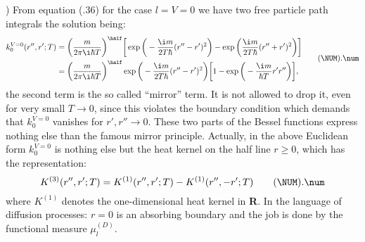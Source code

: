 )
{}From equation (\NUM.36) for the case $l=V=0$ we have two free particle
path integrals the solution being:
\plus
$$\aligned
  k_0^{V=0}(r'',r';T)&=
 \bigg({m\over2\pi\i\hbar T}\bigg)^\half
  \bigg[\exp\bigg(-{\i m\over2T\hbar}(r''-r')^2\bigg)
       -\exp\bigg({\i m\over2T\hbar}(r''+r')^2\bigg)\bigg]\\
  &=\bigg({m\over2\pi\i\hbar T}\bigg)^\half
  \exp\bigg(-{\i m\over2T\hbar}(r''-r')^2\bigg)
  \bigg[ 1-\exp\bigg(-{\i m\over\hbar T}r'r''\bigg)\bigg],
  \endaligned
  \tag\NUM.\num$$
\def\numCDxc{4.38}%
the second term is the so called ``mirror'' term. It is not allowed to
drop it, even for very small $T\to0$, since this violates the boundary
condition which demands that $k_0^{V=0}$ vanishes for $r',r''\to0$.
These two parts of the Bessel functions express nothing else than the
famous mirror principle. Actually, in the above Euclidean form
$k_0^{V=0}$ is nothing else  but the heat kernel on the half line
$r\geq0$, which has the representation:
\plus
$$K^{(3)}(r'',r';T)=K^{(1)}(r'',r';T)-K^{(1)}(r'',-r';T)
  \tag\NUM.\num$$
where $K^{(1)}$ denotes the one-dimensional heat kernel in {\bf R}. In
the language of diffusion processes: $r=0$ is an absorbing boundary and
the job is done by the functional measure $\mu_l^{(D)}$.

